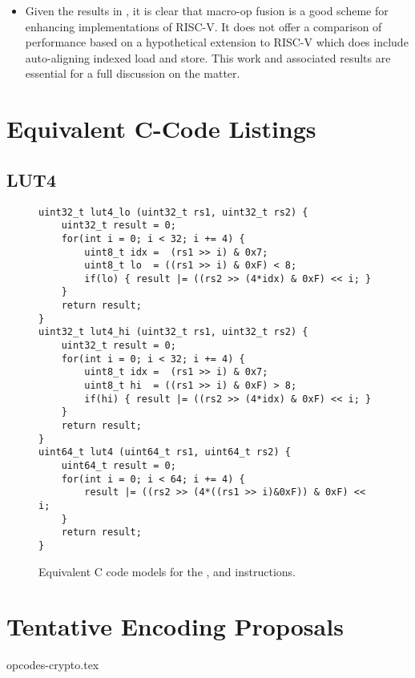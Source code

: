 \begin{itemize}
\item Given the results in \cite{CDPA:16}, it is clear that
    macro-op fusion is a good scheme for enhancing implementations of
    RISC-V.
    It does not offer a comparison of performance based on a
    hypothetical extension to RISC-V which does include
    auto-aligning indexed load and store.
    This work and associated results are essential for a full discussion on
    the matter.
\end{itemize}



\newpage
\section{Equivalent C-Code Listings}
\label{sec:ccode}

\subsection{LUT4}
\label{sec:ccode:lut4}

\begin{figure}[h]
\begin{lstlisting}[style=C]
uint32_t lut4_lo (uint32_t rs1, uint32_t rs2) {
    uint32_t result = 0;
    for(int i = 0; i < 32; i += 4) {
        uint8_t idx =  (rs1 >> i) & 0x7;
        uint8_t lo  = ((rs1 >> i) & 0xF) < 8;
        if(lo) { result |= ((rs2 >> (4*idx) & 0xF) << i; }
    }
    return result;
}
uint32_t lut4_hi (uint32_t rs1, uint32_t rs2) {
    uint32_t result = 0;
    for(int i = 0; i < 32; i += 4) {
        uint8_t idx =  (rs1 >> i) & 0x7;
        uint8_t hi  = ((rs1 >> i) & 0xF) > 8;
        if(hi) { result |= ((rs2 >> (4*idx) & 0xF) << i; }
    }
    return result;
}
uint64_t lut4 (uint64_t rs1, uint64_t rs2) {
    uint64_t result = 0;
    for(int i = 0; i < 64; i += 4) {
        result |= ((rs2 >> (4*((rs1 >> i)&0xF)) & 0xF) << i;
    }
    return result;
}
\end{lstlisting}
\caption{
    Equivalent C code models for the
    ,  and 
    instructions.
}
\label{fig:equiv:c:lut4}
\end{figure}


\newpage
\section{Tentative Encoding Proposals}


{opcodes-crypto.tex}


